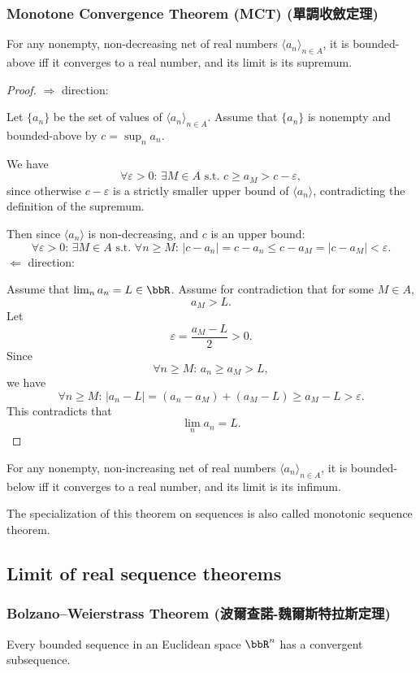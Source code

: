 \subsubsection{Monotone Convergence Theorem (MCT) (單調收斂定理)}
For any nonempty, non-decreasing net of real numbers $\langle a_n\rangle_{n\in A}$, it is bounded-above iff it converges to a real number, and its limit is its supremum.
\begin{proof}
$\Rightarrow$ direction:

Let $\{a_n\}$ be the set of values of $\langle a_n\rangle_{n\in A}$. Assume that $\{a_n\}$ is nonempty and bounded-above by $c=\sup_na_n$.

We have
\[\forall\varepsilon>0:\,\exists M\in A\text{\ s.t.\ }c\geq a_M>c-\varepsilon,\]
since otherwise $c-\varepsilon$ is a strictly smaller upper bound of $\langle a_n\rangle$, contradicting the definition of the supremum. 

Then since $\langle a_n\rangle$ is non-decreasing, and $c$ is an upper bound:
\[\forall\varepsilon>0:\,\exists M\in A\text{\ s.t.\ }\forall n\geq M:\,|c-a_n|=c-a_n\leq c-a_M=|c-a_M|<\varepsilon.\]
$\Leftarrow$ direction:

Assume that $\lim_na_n=L\in\bbR$. Assume for contradiction that for some $M\in A$,
\[a_M>L.\]
Let
\[\varepsilon=\frac{a_M-L}{2}>0.\]
Since
\[\forall n\geq M:\, a_n\geq a_M>L,\]
we have
\[\forall n\geq M:\,|a_n-L|=(a_n-a_M)+(a_M-L)\geq a_M-L>\varepsilon.\]
This contradicts that
\[\lim_na_n=L.\]
\end{proof}
For any nonempty, non-increasing net of real numbers $\langle a_n\rangle_{n\in A}$, it is bounded-below iff it converges to a real number, and its limit is its infimum.

The specialization of this theorem on sequences is also called monotonic sequence theorem.
\subsection{Limit of real sequence theorems}
\subsubsection{Bolzano–Weierstrass Theorem (波爾查諾-魏爾斯特拉斯定理)}
Every bounded sequence in an Euclidean space $\bbR^n$ has a convergent subsequence.

